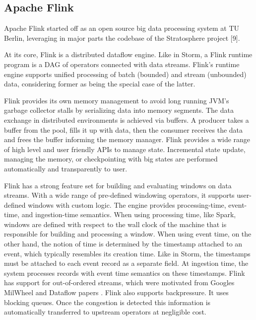 \subsection{Apache Flink}
Apache Flink started off as an open source big data processing system at TU Berlin, leveraging in major parts the codebase of the Stratosphere project [9].

At its core, Flink is a distributed dataflow engine. Like in Storm, a Flink runtime program is a DAG of operators connected with data streams. Flink's runtime engine supports unified processing of batch (bounded) and stream (unbounded) data, considering former as being the special case of the latter.

Flink provides its own memory management to avoid long running JVM's garbage collector stalls by serializing data into memory segments. 
The data exchange in distributed environments is achieved via buffers. A producer takes a buffer from the pool, fills it up with data, then the consumer receives the data and frees the buffer informing the memory manager. Flink provides a wide range of high level and user friendly APIs to manage  state.  Incremental state update, managing the memory, or checkpointing with big states are performed automatically and transparently to user. 

Flink has a strong feature set for building and evaluating windows on data streams. With a wide range of pre-defined windowing operators, it supports user-defined windows with custom logic. The engine provides processing-time, event-time, and ingestion-time semantics. When using processing time, like Spark, windows are defined with respect to the wall clock of the machine that is responsible for building and processing  a window. When using event time, on the other hand, the notion of time is determined by the timestamp attached to an event, which typically resembles its creation time. Like in Storm, the timestamps must be attached to each event record as a separate field. At ingestion time, the system processes records with event time semantics on these timestamps. Flink has support for out-of-ordered streams, which were motivated from Googles MilWheel and Dataflow papers \cite{akidau2013millwheel,akidau2015dataflow}. Flink also supports backpressure. It uses blocking queues. Once the congestion is detected this information is automatically transferred to upstream operators at negligible cost. 

